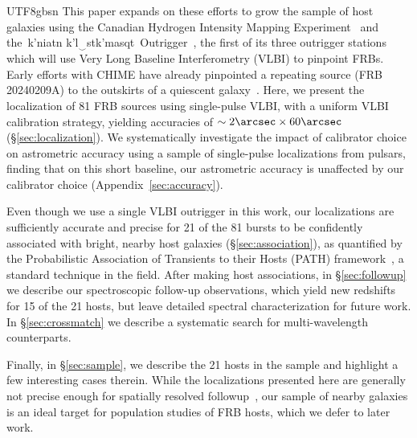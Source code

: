 \documentclass[twocolumn,linenumbers]{aastex631}
\newcommand{\kkoname}{k'ni\textipa{P}atn k'l$\left._\mathrm{\smile}\right.$stk'masqt}
\begin{document}
\begin{CJK*}{UTF8}{gbsn}
This paper expands on these efforts to grow the sample of host galaxies using the Canadian Hydrogen Intensity Mapping Experiment~\citep[CHIME/FRB,][]{collaboration2018chime} and the~\kkoname\ Outrigger~\citep[KKO,][]{lanman2024chime}, the first of its three outrigger stations which will use Very Long Baseline Interferometry (VLBI) to pinpoint FRBs. Early efforts with CHIME have already pinpointed a repeating source (FRB 20240209A) to the outskirts of a quiescent galaxy~\citep{shah2024repeating,eftekhari2024massive}. Here, we present the localization of 81 FRB sources using single-pulse VLBI, with a uniform VLBI calibration strategy, yielding accuracies of $\sim 2\arcsec \times 60\arcsec$ (\S\ref{sec:localization}). We systematically investigate the impact of calibrator choice on astrometric accuracy using a sample of single-pulse localizations from pulsars, finding that on this short baseline, our astrometric accuracy is unaffected by our calibrator choice (Appendix~\ref{sec:accuracy}).

Even though we use a single VLBI outrigger in this work, our localizations are sufficiently accurate and precise for 21 of the 81 bursts to be confidently associated with bright, nearby host galaxies (\S\ref{sec:association}), as quantified by the Probabilistic Association of Transients to their Hosts (PATH) framework~\citep{aggarwal2021probabilistic}, a standard technique in the field. After making host associations, in \S\ref{sec:followup} we describe our spectroscopic follow-up observations, which yield new redshifts for 15 of the 21 hosts, but leave detailed spectral characterization for future work. In \S\ref{sec:crossmatch} we describe a systematic search for multi-wavelength counterparts.
 
Finally, in \S\ref{sec:sample}, we describe the 21 hosts in the sample and highlight a few interesting cases therein. While the localizations presented here are generally not precise enough for spatially resolved followup~\citep[e.g.,][]{mannings2021high,woodland2023environments}, our sample of nearby galaxies is an ideal target for population studies of FRB hosts, which we defer to later work. %


\end{CJK*}
\end{document}
